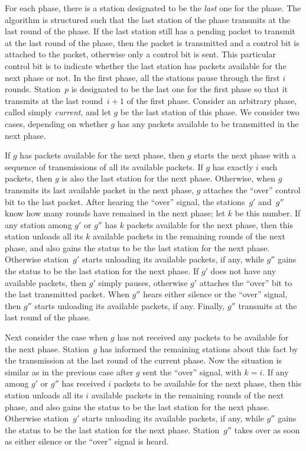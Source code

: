 \documentclass[11pt]{article}
\begin{document}
For each phase, there is a station designated to be the \emph{last} one for the phase.
The algorithm is structured such that the last station of the phase transmits at the last round of the phase.
If the last station still has a pending packet to transmit at the last round of the phase, then the packet is transmitted and a control bit is attached to the packet, otherwise only a control bit is sent.
This particular control bit is to indicate whether the last station has packets available for the next phase or not.
In the first phase, all the stations pause  through the first $i$ rounds.
Station~$p$ is designated to be the last one for the first phase so that it transmits at the last round~$i+1$ of the first phase.
Consider an arbitrary phase, called simply \emph{current}, and let $g$ be the last station of this phase.
We consider two cases, depending on whether $g$ has any packets available to be transmitted in the next phase.

If $g$ has packets available for the next phase, then $g$ starts the next phase with a sequence of transmissions of all its available packets.
If $g$ has exactly $i$ such packets, then $g$ is also the last station for the next phase.
Otherwise, when $g$ transmits its last available packet in the next phase, $g$ attaches the ``over'' control bit to the last packet.
After hearing the ``over'' signal, the stations~$g'$ and~$g''$ know how many rounds have remained in the next phase; let $k$ be this number.
If any station among $g'$ or $g''$ has $k$ packets available for the next phase, then this station unloads all its $k$ available packets in the remaining rounds of the next phase, and also gains the status to be the last station for the next phase.
Otherwise station~$g'$ starts unloading its available packets, if any, while $g''$ gains the status to be the last station for the next phase.
If $g'$ does not have any available packets, then $g'$ simply pauses, otherwise $g'$ attaches the ``over'' bit to the last transmitted packet.
When $g''$ hears either silence or the ``over'' signal, then $g''$ starts unloading its available packets, if any.
Finally, $g''$ transmits at the last round of the phase.

Next consider the case when $g$ has not received any packets to be available for the next  phase.
Station~$g$ has informed the remaining stations about this fact by the transmission at the last round of the current phase.
Now the situation is similar as in the previous case after $g$ sent the ``over'' signal, with $k=i$.
If any among $g'$ or $g''$ has received $i$ packets to be available for the next phase, then this station unloads all its $i$ available packets in the remaining rounds of the next phase, and also gains the status to be the last station for the next phase.
Otherwise station~$g'$ starts unloading its available packets, if any, while $g''$ gains the status to be the last station for the next phase.
Station~$g''$ takes over as soon as either silence or the ``over'' signal is heard.
\end{document}
